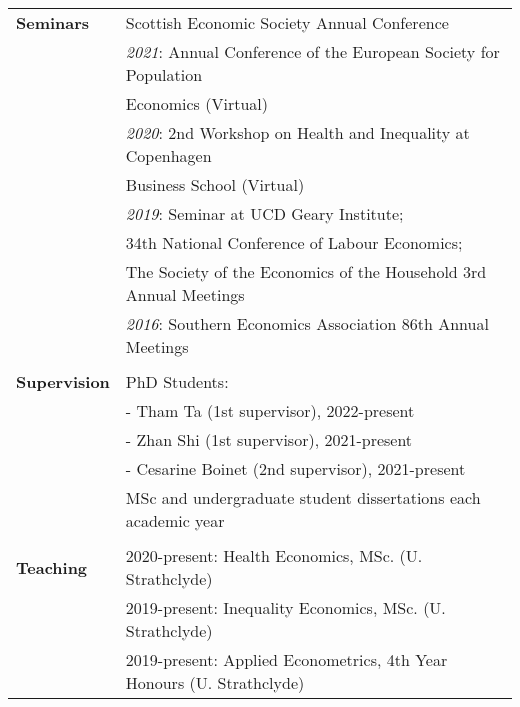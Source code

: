 \documentclass[11pt,a4paper]{article}
\begin{document}
\begin{longtable}{l l}
\textbf{Seminars}													&  \quad \quad  \;\; Scottish Economic Society Annual Conference  \\
\addlinespace
																												&  \textit{2021}: Annual Conference of the European Society for Population  \\ 
																												&  \quad \quad  \;\; Economics (Virtual)  \\
\addlinespace
																												&  \textit{2020}: 2nd Workshop on Health and Inequality at Copenhagen   \\
																												&  \quad \quad  \;\; Business School (Virtual)  \\
\addlinespace
																												&  \textit{2019}: Seminar at UCD Geary Institute;   \\
																												&  \quad \quad  \;\; 34th National Conference of Labour Economics;   \\
																												&  \quad \quad  \;\; The Society of the Economics of the Household 3rd Annual Meetings  \\
\addlinespace																												
																												& \textit{2016}: Southern Economics Association 86th Annual Meetings  \\				
																												&  \\
\textbf{Supervision}											&  PhD Students:  \\
																												&  \hspace{0.05cm} - Tham Ta (1st supervisor), 2022-present \\
																												&  \hspace{0.05cm} - Zhan Shi (1st supervisor), 2021-present  \\
																												&  \hspace{0.05cm} - Cesarine Boinet (2nd supervisor), 2021-present  \\
\addlinespace																												
																												& MSc and undergraduate student dissertations each academic year  \\			
																												&  \\
\textbf{Teaching}													&  2020-present: Health Economics, MSc. (U. Strathclyde)  \\  															
																												&  2019-present: Inequality Economics, MSc. (U. Strathclyde)	   \\
																												&  2019-present: Applied Econometrics, 4th Year Honours (U. Strathclyde)  \\

\end{longtable}
\end{document}
